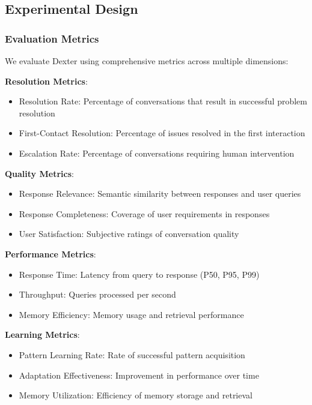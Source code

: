 \documentclass[11pt]{article}
\begin{document}
\subsection{Experimental Design}

\subsubsection{Evaluation Metrics}

We evaluate Dexter using comprehensive metrics across multiple dimensions:

\textbf{Resolution Metrics}:
\begin{itemize}
\item Resolution Rate: Percentage of conversations that result in successful problem resolution
\item First-Contact Resolution: Percentage of issues resolved in the first interaction
\item Escalation Rate: Percentage of conversations requiring human intervention
\end{itemize}

\textbf{Quality Metrics}:
\begin{itemize}
\item Response Relevance: Semantic similarity between responses and user queries
\item Response Completeness: Coverage of user requirements in responses
\item User Satisfaction: Subjective ratings of conversation quality
\end{itemize}

\textbf{Performance Metrics}:
\begin{itemize}
\item Response Time: Latency from query to response (P50, P95, P99)
\item Throughput: Queries processed per second
\item Memory Efficiency: Memory usage and retrieval performance
\end{itemize}

\textbf{Learning Metrics}:
\begin{itemize}
\item Pattern Learning Rate: Rate of successful pattern acquisition
\item Adaptation Effectiveness: Improvement in performance over time
\item Memory Utilization: Efficiency of memory storage and retrieval
\end{itemize}
\end{document}

